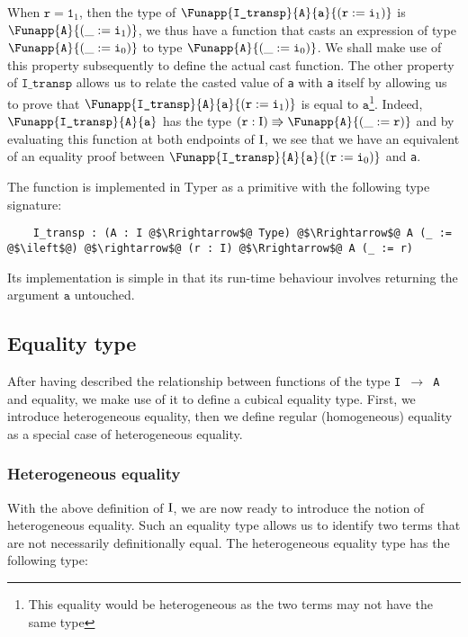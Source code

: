 \documentclass[12pt,twoside,maitrise]{dms}
\theoremstyle{definition}
\numberwithin{equation}{section}
\numberwithin{table}{chapter}
\numberwithin{figure}{chapter}
\newcommand\id[1] {\texttt{#1}}
\newcommand\fn[1] {\texttt{#1}}
\begin{document}
When $\id{r} = \id{1}_1$, then the type of
$\Funapp{\id{I\_transp}}{\id{A}}{\id{a}}{(\earg{\id{r}}{\id{i}_1})}$ is
$\Funapp{\id{A}}{(\earg{\id{i}_1})}$, we thus have a function that casts an
expression of type $\Funapp{\id{A}}{(\earg{\id{i}_0})}$ to type
$\Funapp{\id{A}}{(\earg{\id{i}_0})}$. We shall make use of this property
subsequently to define the actual cast function. The other property of
$\id{I\_transp}$ allows us to relate the casted value of \id{a} with \id{a}
itself by allowing us to prove that
$\Funapp{\id{I\_transp}}{\id{A}}{\id{a}}{(\earg{\id{r}}{\id{i}_1})}$ is equal to
$\id{a}$\footnote{This equality would be heterogeneous as the two terms may not
have the same type}. Indeed, $\Funapp{\id{I\_transp}}{\id{A}}{\id{a}}$ has the
type $(\id{r} : \bI) \Rrightarrow \Funapp{\id{A}}{(\earg{\id{r}})}$ and by
evaluating this function at both endpoints of $\mathrm{I}$, we see that we have an
equivalent of an equality proof between
$\Funapp{\id{I\_transp}}{\id{A}}{\id{a}}{(\earg{\id{r}}{\id{i}_0})}$ and \id{a}.

The function is implemented in Typer as a primitive with the following type
signature:

\begin{verbatim}
    I_transp : (A : I @$\Rrightarrow$@ Type) @$\Rrightarrow$@ A (_ := @$\ileft$@) @$\rightarrow$@ (r : I) @$\Rrightarrow$@ A (_ := r)
\end{verbatim}

Its implementation is simple in that its run-time behaviour involves returning
the argument $\id{a}$ untouched.

\subsection{Equality type}\label{sec:identity}

After having described the relationship between functions of the type \fn{I
  $\rightarrow$ A} and equality, we make use of it to define a cubical equality
type. First, we introduce heterogeneous equality, then we define regular
(homogeneous) equality as a special case of heterogeneous equality.

\subsubsection{Heterogeneous equality}
With the above definition of $\mathrm{I}$, we are now ready to introduce the notion of
heterogeneous equality. Such an equality type allows us to identify two terms
that are not necessarily definitionally equal. The heterogeneous equality type
has the following type:
\end{document}
